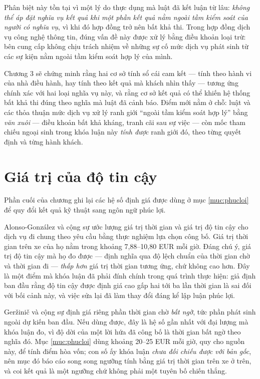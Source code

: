 Phân biệt này tồn tại vì một lý do thực dụng mà luật đã kết luận từ lâu: \emph{không thể áp đặt
nghĩa vụ kết quả khi một phần kết quả nằm ngoài tầm kiểm soát của người có nghĩa vụ}, vì khi đó
hợp đồng trở nên bất khả thi. Trong hợp đồng dịch vụ công nghệ thông tin, đúng vấn đề này được
xử lý bằng điều khoản loại trừ: bên cung cấp không chịu trách nhiệm về những sự cố mức dịch vụ
phát sinh từ các sự kiện nằm ngoài tầm kiểm soát hợp lý của mình.

Chương 3 sẽ chứng minh rằng hai cơ sở tính sổ cái cam kết --- tính theo hành vi của nhà điều
hành, hay tính theo kết quả mà khách nhìn thấy --- tương ứng chính xác với hai loại nghĩa vụ
này, và rằng cơ sở kết quả có thể khiến hệ thống bất khả thi đúng theo nghĩa mà luật đã cảnh
báo. Điểm mới nằm ở chỗ: luật và các thỏa thuận mức dịch vụ xử lý ranh giới ``ngoài tầm kiểm
soát hợp lý'' bằng \emph{văn xuôi} --- điều khoản bất khả kháng, tranh cãi sau sự việc --- còn
mốc tham chiếu ngoại sinh trong khóa luận này \emph{tính được} ranh giới đó, theo từng quyết
định và từng hành khách.

\section{Giá trị của độ tin cậy}

Phần cuối của chương ghi lại các hệ số định giá được dùng ở mục \ref{muc:phucloi} để quy đổi kết quả kỹ thuật
sang ngôn ngữ phúc lợi.

Alonso-González và cộng sự \cite{alonsogonzalez2020} ước lượng giá trị thời gian và giá trị độ
tin cậy cho dịch vụ đi chung theo yêu cầu bằng thực nghiệm lựa chọn công bố. Giá trị thời gian
trên xe của họ nằm trong khoảng 7{,}88--10{,}80 EUR mỗi giờ. Đáng chú ý, giá trị độ tin cậy mà
họ đo được --- định nghĩa qua độ lệch chuẩn của thời gian chờ và thời gian đi --- \emph{thấp
hơn} giá trị thời gian tương ứng, chứ không cao hơn. Đây là một điểm mà khóa luận đã phải đính
chính trong quá trình thực hiện: giả định ban đầu rằng độ tin cậy được định giá cao gấp hai tới
ba lần thời gian là sai đối với bối cảnh này, và việc sửa lại đã làm thay đổi đáng kể lập luận
phúc lợi.

Geržinič và cộng sự \cite{gerzinic2023} định giá riêng phần thời gian chờ \emph{bất ngờ}, tức phần
phát sinh ngoài dự kiến ban đầu. Nếu dùng được, đây là hệ số gần nhất với đại lượng mà khóa luận
đo, vì độ dời của một lời hứa đã công bố là thời gian bất ngờ theo nghĩa đó. Mục \ref{muc:phucloi}
dùng khoảng 20--25 EUR mỗi giờ, quy cho nguồn này, để tính điểm hòa vốn; con số ấy khóa luận
\emph{chưa đối chiếu được với bản gốc}, nên mục đó báo cáo song song ngưỡng tính bằng giá trị thời
gian trên xe ở trên, và coi kết quả là một ngưỡng chứ không phải một tuyên bố chiến thắng.

